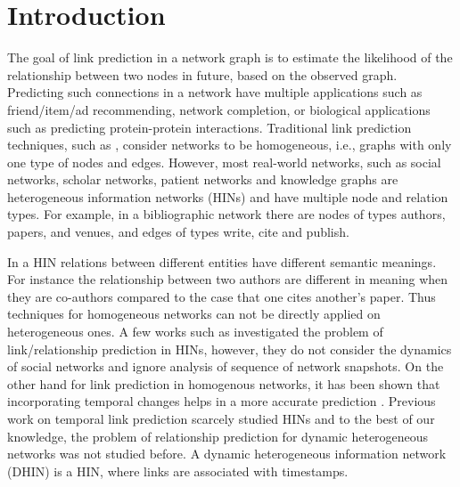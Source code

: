 \section{Introduction}
\label{Sec:Introduction}


The goal of link prediction in a network graph \cite{liben2007link} is to estimate the likelihood of the relationship between two nodes in future, based on the observed graph. Predicting such connections in a network have multiple applications such as friend/item/ad recommending, network completion, or biological applications such as predicting protein-protein interactions. Traditional link prediction techniques, such as \cite{liben2007link}, consider networks to be homogeneous, i.e., graphs with only one type of nodes and edges. However, most real-world networks, such as social networks, scholar networks, patient networks \cite{denny2012mining} and knowledge graphs \cite{wang2015incorporating} are heterogeneous information networks (HINs) \cite{shi2017survey} and have multiple node and relation types. For example, in a bibliographic network there are nodes of types authors, papers, and venues, and edges of types write, cite and publish.%

In a HIN relations between different entities have different semantic meanings. For instance the relationship between two authors are different in meaning when they are co-authors compared to the case that one cites another's paper. Thus techniques for homogeneous networks can not be directly applied on heterogeneous ones. A few works such as \cite{sun2011pathsim,sun2011ASONAM} investigated the problem of link/relationship prediction in HINs, however, they do not consider the dynamics of social networks and ignore analysis of sequence of network snapshots. On the other hand for link prediction in homogenous networks, it has been shown that  incorporating temporal changes helps in a more accurate prediction \cite{Zhu2016}. Previous work on temporal link prediction scarcely studied HINs and to the best of our knowledge, the problem of relationship prediction for dynamic heterogeneous networks was not studied before. A dynamic heterogeneous information network (DHIN) is a HIN, where links are associated with timestamps.

